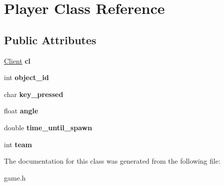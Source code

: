 \hypertarget{class_player}{\section{Player Class Reference}
\label{class_player}
}
\subsection*{Public Attributes}
\begin{DoxyCompactItemize}
\item 
\hypertarget{class_player_a22c96380052d528c6e0eec91ceaf334b}{\hyperlink{class_client}{Client} {\bfseries cl}}\label{class_player_a22c96380052d528c6e0eec91ceaf334b}

\item 
\hypertarget{class_player_a8cb531195e9d96c8320cfbe0fc145495}{int {\bfseries object\-\_\-id}}\label{class_player_a8cb531195e9d96c8320cfbe0fc145495}

\item 
\hypertarget{class_player_ab5e831cac1c83f718e1dfa72aba77d06}{char {\bfseries key\-\_\-pressed}}\label{class_player_ab5e831cac1c83f718e1dfa72aba77d06}

\item 
\hypertarget{class_player_acdf217201e6fe6ed898c2e15292ef252}{float {\bfseries angle}}\label{class_player_acdf217201e6fe6ed898c2e15292ef252}

\item 
\hypertarget{class_player_ad29b77b310b9417af5ded0fe08778ac3}{double {\bfseries time\-\_\-until\-\_\-spawn}}\label{class_player_ad29b77b310b9417af5ded0fe08778ac3}

\item 
\hypertarget{class_player_a26731f05ed89c4f8a30ec960d217d746}{int {\bfseries team}}\label{class_player_a26731f05ed89c4f8a30ec960d217d746}

\end{DoxyCompactItemize}


The documentation for this class was generated from the following file\-:\begin{DoxyCompactItemize}
\item 
game.\-h\end{DoxyCompactItemize}
